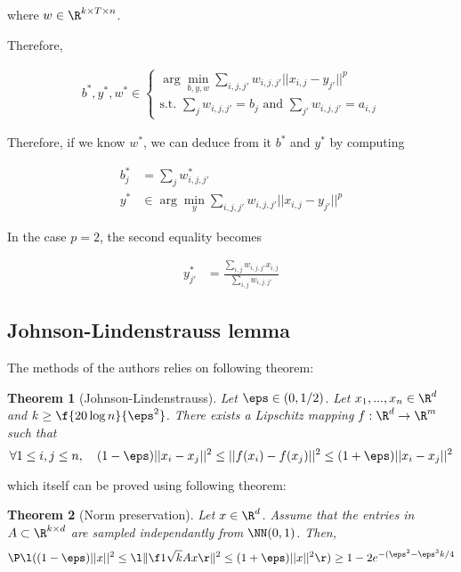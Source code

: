 \documentclass[11pt,a4paper]{article}
\newtheorem{theorem}{Theorem}
\begin{document}
where $w \in \R^{k\times T \times n}$.

Therefore,

\begin{align}
    \label{eqn:discretewb}
    b^*, y^*, w^* \in 
    \begin{cases}
        \arg\min_{b, y, w} \sum_{i, j, j'} w_{i,j,j'} ||x_{i, j} - y_{j'}||^p \\
        \text{s.t. } \sum_j w_{i,j,j'} = b_j \text{ and } \sum_{j'} w_{i,j,j'} = a_{i,j}
    \end{cases}
\end{align}

Therefore, if we know $w^*$, we can deduce from it $b^*$ and $y^*$ by computing

\begin{align}
    b^*_j &= \sum_j w^*_{i,j,j'}  \label{eqn:b}\\
    y^* &\in \arg \min_y \sum_{i, j, j'} w_{i,j,j'} ||x_{i, j} - y_{j'}||^p \label{eqn:y}
\end{align}

In the case $p=2$, the second equality becomes

\begin{align*}
    y^*_{j'} &= \frac {\sum_{i, j} w_{i,j,j'} x_{i, j}} {\sum_{i, j} w_{i,j,j'}}
\end{align*}

\subsection{Johnson-Lindenstrauss lemma}
\label{subscn:johnson}

The methods of the authors relies on following theorem:

\begin{theorem}[Johnson-Lindenstrauss]
Let $\eps \in (0, 1/2)$. Let $x_1, ..., x_n \in \R^d$ and $k \geq \f {20 \log n} {\eps^2}$. There exists a Lipschitz mapping $f: \R^d \to \R^m$ such that
$$\forall 1 \leq i, j \leq n, \quad (1 - \eps) ||x_i - x_j||^2 \leq ||f(x_i) - f(x_j)||^2 \leq (1 + \eps) ||x_i - x_j||^2$$
\end{theorem}

which itself can be proved using following theorem:

\begin{theorem}[Norm preservation]
Let $x\in \R^d$. Assume that the entries in $A\subset \R^{k\times d}$ are sampled independantly from $\NN(0, 1)$. Then,
$$\P \l( (1 - \eps) ||x||^2 \leq \l\lVert \f 1 {\sqrt k} A x \r\rVert^2 \leq (1 + \eps) ||x||^2 \r) \geq 1 - 2e^{-(\eps^2 -\eps^3 k/4} $$
\end{theorem}
\end{document}
